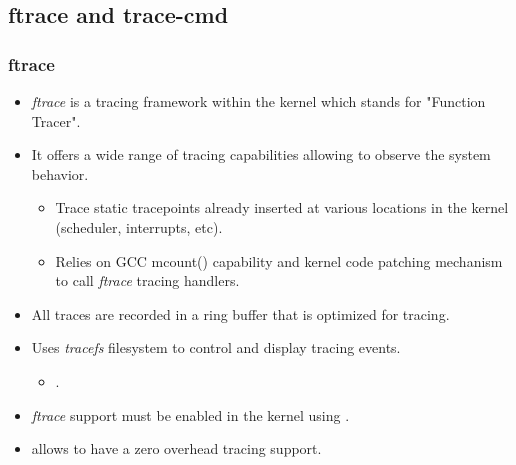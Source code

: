 \subsection{ftrace and trace-cmd}

\begin{frame}
  \frametitle{ftrace}
  \begin{itemize}
    \item {\em ftrace} is a tracing framework within the kernel which stands for
          "Function Tracer".
    \item It offers a wide range of tracing capabilities allowing to observe the
          system behavior.
    \begin{itemize}
      \item Trace static tracepoints already inserted at various locations
            in the kernel (scheduler, interrupts, etc).
      \item Relies on GCC mcount() capability and kernel code patching mechanism
            to call {\em ftrace} tracing handlers.
    \end{itemize}
    \item All traces are recorded in a ring buffer that is optimized for tracing.
    \item Uses {\em tracefs} filesystem to control and display tracing events.
    \begin{itemize}
      \item {}.
    \end{itemize}
    \item {\em ftrace} support must be enabled in the kernel using
          .
    \item {} allows to have a zero overhead tracing
          support.
  \end{itemize}
\end{frame}

